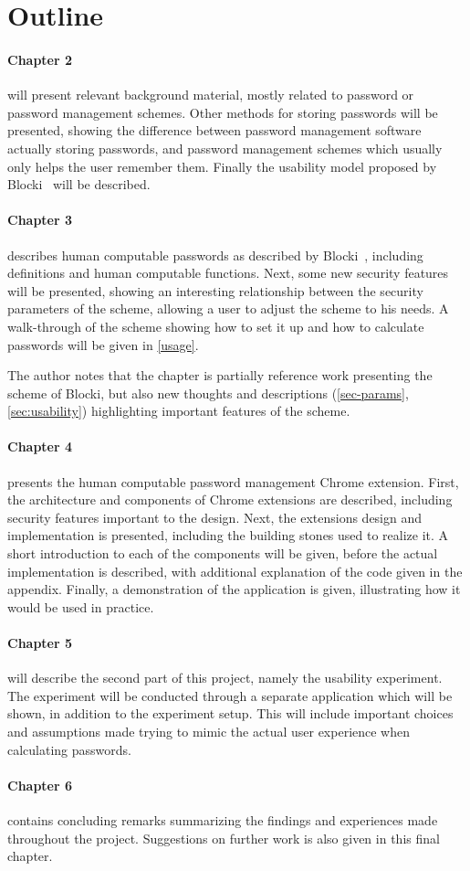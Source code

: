 \section{Outline}
\paragraph{Chapter 2} will present relevant background material, mostly related to password or password management schemes. Other methods for storing passwords will be presented, showing the difference between password management software actually storing passwords, and password management schemes which usually only helps the user remember them. Finally the usability model proposed by Blocki~\cite{Blocki2014} will be described.
\paragraph{Chapter 3} describes human computable passwords as described by Blocki~\cite{hcp-blocki}, including definitions and human computable functions. Next, some new security features will be presented, showing an interesting relationship between the security parameters of the scheme, allowing a user to adjust the scheme to his needs. A walk-through of the scheme showing how to set it up and how to calculate passwords will be given in \autoref{usage}.
\par The author notes that the chapter is partially reference work presenting the scheme of Blocki, but also new thoughts and descriptions (\autoref{sec-params}, \autoref{sec:usability}) highlighting important features of the scheme. 
\paragraph{Chapter 4} presents the human computable password management Chrome extension. First, the architecture and components of Chrome extensions are described, including security features important to the design. Next, the extensions design and implementation is presented, including the building stones used to realize it. A short introduction to each of the components will be given, before the actual implementation is described, with additional explanation of the code given in the appendix. Finally, a demonstration of the application is given, illustrating how it would be used in practice. 
\paragraph{Chapter 5} will describe the second part of this project, namely the usability experiment. The experiment will be conducted through a separate application which will be shown, in addition to the experiment setup. This will include important choices and assumptions made trying to mimic the actual user experience when calculating passwords.
\paragraph{Chapter 6} contains concluding remarks summarizing the findings and experiences made throughout the project. Suggestions on further work is also given in this final chapter.



